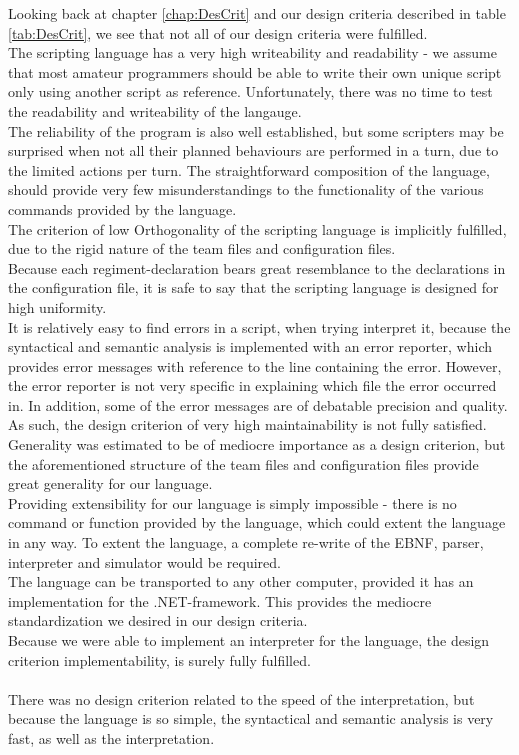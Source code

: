 	Looking back at chapter \ref{chap:DesCrit} and our design criteria described in table \ref{tab:DesCrit}, we see that not all of our design criteria were fulfilled. \\
	The scripting language has a very high writeability and readability - we assume that most amateur programmers should be able to write their own unique script only using another script as reference. Unfortunately, there was no time to test the readability and writeability of the langauge. \\
	The reliability of the program is also well established, but some scripters may be surprised when not all their planned behaviours are performed in a turn, due to the limited actions per turn. The straightforward composition of the language, should provide very few misunderstandings to the functionality of the various commands provided by the language.\\
	The criterion of low Orthogonality of the scripting language is implicitly fulfilled, due to the rigid nature of the team files and configuration files.\\ 
	Because each regiment-declaration bears great resemblance to the declarations in the configuration file, it is safe to say that the scripting language is designed for high uniformity. \\
	It is relatively easy to find errors in a script, when trying interpret it, because the syntactical and semantic analysis is implemented with an error reporter, which provides error messages with reference to the line containing the error. However, the error reporter is not very specific in explaining which file the error occurred in. In addition, some of the error messages are of debatable precision and quality. As such, the design criterion of very high maintainability is not fully satisfied.\\
	Generality was estimated to be of mediocre importance as a design criterion, but the aforementioned structure of the team files and configuration files provide great generality for our language.\\
	Providing extensibility for our language is simply impossible - there is no command or function provided by the language, which could extent the language in any way. To extent the language, a complete re-write of the EBNF, parser, interpreter and simulator would be required. \\
	The language can be transported to any other computer, provided it has an implementation for the .NET-framework. This provides the mediocre standardization we desired in our design criteria.\\
	Because we were able to implement an interpreter for the language, the design criterion implementability, is surely fully fulfilled.\\
	\\
	
	There was no design criterion related to the speed of the interpretation, but because the language is so simple, the syntactical and semantic analysis is very fast, as well as the interpretation.